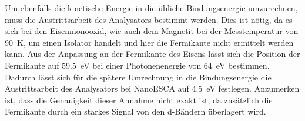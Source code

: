         Um ebenfalls die kinetische Energie in die übliche Bindungsenergie umzurechnen, muss die Austrittsarbeit des Analysators bestimmt werden.
        Dies ist nötig, da es sich bei den Eisenmonooxid, wie auch dem Magnetit bei der Messtemperatur von \SI{90}{\kelvin}, um einen Isolator handelt und hier die Fermikante nicht ermittelt werden kann.
        Aus der Anpassung an der Fermikante des Eisens lässt sich die Position der Fermikante auf \SI{59.5}{\electronvolt} bei einer Photonenenergie von \SI{64}{\electronvolt} bestimmen.
        Dadurch lässt sich für die spätere Umrechnung in die Bindungsenergie die Austrittsarbeit des Analysators bei NanoESCA auf \SI{4.5}{\electronvolt} festlegen. 
        Anzumerken ist, dass die Genauigkeit dieser Annahme nicht exakt ist, da zusätzlich die Fermikante durch ein starkes Signal von den d-Bändern überlagert wird.

